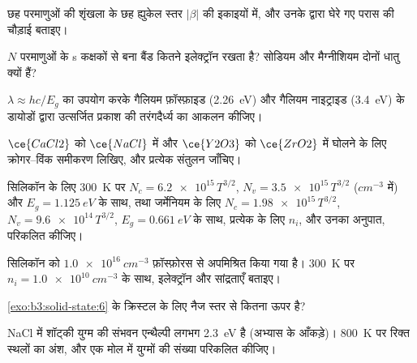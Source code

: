 \begin{exercise}[$\star$]\label{exo:b3:solid-state:1}
छह परमाणुओं की शृंखला के छह ह्युकेल स्तर $|\beta|$ की इकाइयों में, और उनके द्वारा घेरे गए परास
की चौड़ाई बताइए।
\end{exercise}

\begin{exercise}[$\star$]\label{exo:b3:solid-state:2}
$N$ परमाणुओं के s कक्षकों से बना बैंड कितने इलेक्ट्रॉन रखता है? सोडियम और मैग्नीशियम
दोनों धातु क्यों हैं?
\end{exercise}

\begin{exercise}[$\star$]\label{exo:b3:solid-state:3}
$\lambda \approx hc/E_g$ का उपयोग करके गैलियम फ़ॉस्फ़ाइड
(\qty{2.26}{eV}) और गैलियम नाइट्राइड (\qty{3.4}{eV}) के डायोडों द्वारा उत्सर्जित प्रकाश की तरंगदैर्ध्य का आकलन कीजिए।
\end{exercise}

\begin{exercise}[$\star$]\label{exo:b3:solid-state:4}
$\ce{CaCl2}$ को $\ce{NaCl}$ में और $\ce{Y2O3}$ को $\ce{ZrO2}$ में घोलने के लिए क्रोगर--विंक समीकरण लिखिए, और
प्रत्येक संतुलन जाँचिए।
\end{exercise}

\begin{exercise}[$\star\star$]\label{exo:b3:solid-state:5}
सिलिकॉन के लिए \qty{300}{K} पर $N_c = \num{6.2e15}\,T^{3/2}$, $N_v = \num{3.5e15}\,T^{3/2}$ ($\unit{cm^{-3}}$ में) और $E_g = \qty{1.125}{eV}$ के साथ,
तथा जर्मेनियम के लिए $N_c = \num{1.98e15}\,T^{3/2}$, $N_v = \num{9.6e14}\,T^{3/2}$, $E_g = \qty{0.661}{eV}$ के साथ, प्रत्येक के लिए $n_i$, और उनका
अनुपात, परिकलित कीजिए।
\end{exercise}

\begin{exercise}[$\star\star$]\label{exo:b3:solid-state:6}
सिलिकॉन को $\qty{1.0e16}{cm^{-3}}$ फ़ॉस्फ़ोरस से अपमिश्रित किया गया है। \qty{300}{K} पर $n_i = \qty{1.0e10}{cm^{-3}}$ के साथ,
इलेक्ट्रॉन और  सांद्रताएँ बताइए।
\end{exercise}

\begin{exercise}[$\star\star$]\label{exo:b3:solid-state:7}
\cref{exo:b3:solid-state:6} के क्रिस्टल के लिए  नैज स्तर से
कितना ऊपर है?
\end{exercise}

\begin{exercise}[$\star\star$]\label{exo:b3:solid-state:8}
NaCl में शॉट्की युग्म की संभवन एन्थैल्पी लगभग \qty{2.3}{eV} है (अभ्यास के
आँकड़े)। \qty{800}{K} पर रिक्त स्थलों का अंश, और एक मोल में
युग्मों की संख्या परिकलित कीजिए।
\end{exercise}

